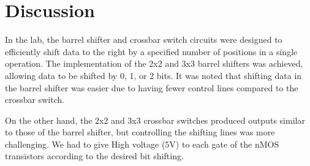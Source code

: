 \documentclass[a4paper,12pt]{article}
\begin{document}
	\section{Discussion }
	
	In the lab, the barrel shifter and crossbar switch circuits were designed to efficiently shift data to the right by a specified number of positions in a single operation. The implementation of the 2x2 and 3x3 barrel shifters was achieved, allowing data to be shifted by 0, 1, or 2 bits. It was noted that shifting data in the barrel shifter was easier due to having fewer control lines compared to the crossbar switch.
	
	On the other hand, the 2x2 and 3x3 crossbar switches produced outputs similar to those of the barrel shifter, but controlling the shifting lines was more challenging. We had to give High voltage (5V) to each gate of the nMOS transistors according to the desired bit shifting.

	
	
	
\end{document}
